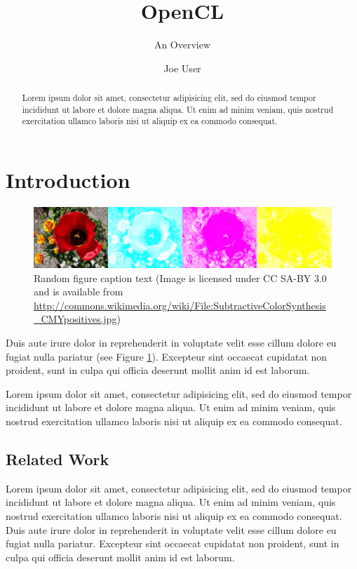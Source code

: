 \documentclass{scrartcl}
\title{OpenCL}
\subtitle{An Overview}
\author{Joe User}
\begin{document}
\maketitle

\begin{abstract}
Lorem ipsum dolor sit amet, consectetur adipisicing elit, sed do eiusmod tempor incididunt ut labore et dolore magna aliqua. Ut enim ad minim veniam, quis nostrud exercitation ullamco laboris nisi ut aliquip ex ea commodo consequat.
\end{abstract}

\section{Introduction}

\begin{figure}
  \includegraphics[width=1\textwidth]{SubtractiveColorSynthesis_CMYpositives.jpg}
  \caption{Random figure caption text {\tiny (Image is licensed under CC
  SA-BY 3.0 and is available from
  \url{http://commons.wikimedia.org/wiki/File:SubtractiveColorSynthesis_CMYpositives.jpg})}}
  \label{fig:foo}
\end{figure}

Duis aute irure dolor in reprehenderit in voluptate velit esse
cillum dolore eu fugiat nulla pariatur (see Figure
\ref{fig:foo}). Excepteur sint occaecat
cupidatat non proident, sunt in culpa qui officia deserunt mollit
anim id est laborum\cite{NUS:PIE:GRI:KLE:1978}.

Lorem ipsum dolor sit amet, consectetur adipisicing elit, sed do
eiusmod tempor incididunt ut labore et dolore magna aliqua. Ut
enim ad minim veniam, quis nostrud exercitation ullamco laboris
nisi ut aliquip ex ea commodo consequat\cite{YOU:1967}.

\subsection{Related Work}

Lorem ipsum dolor sit amet, consectetur adipisicing elit, sed do
eiusmod tempor incididunt ut labore et dolore magna aliqua. Ut
enim ad minim veniam, quis nostrud exercitation ullamco laboris
nisi ut aliquip ex ea commodo consequat. Duis aute irure dolor in
reprehenderit in voluptate velit esse cillum dolore eu fugiat
nulla pariatur. Excepteur sint occaecat cupidatat non proident,
sunt in culpa qui officia deserunt mollit anim id est laborum.
\end{document}
